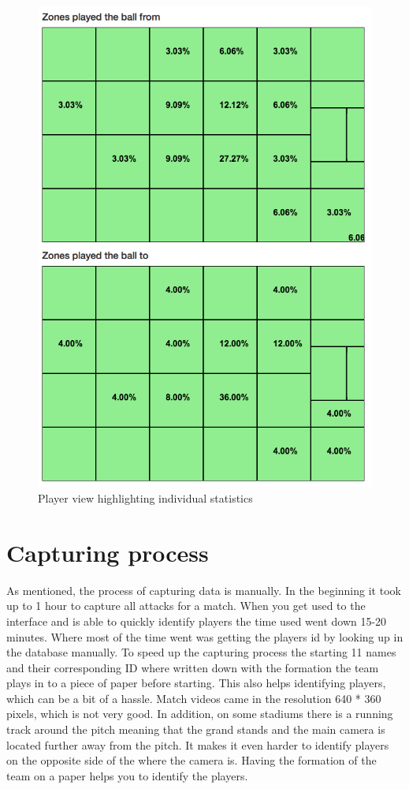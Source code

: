 \begin{figure}[ht!]
\centering
\includegraphics[width=1\textwidth]{images/general/player_view2.png}
\caption{Player view highlighting individual statistics}
\label{fig:player_view2}
\end{figure}


\section{Capturing process}
\label{sec:capprocess}

As mentioned, the process of capturing data is manually. In the beginning it took up to 1 hour to capture all attacks for a match. When you get used to the interface and is able to quickly identify players the time used went down 15-20 minutes. Where most of the time went was getting the players id by looking up in the database manually. To speed up the capturing process the starting 11 names and their corresponding ID where written down with the formation the team plays in to a piece of paper before starting. This also helps identifying players, which can be a bit of a hassle. Match videos came in the resolution 640 * 360 pixels, which is not very good. In addition, on some stadiums there is a running track around the pitch meaning that the grand stands and the main camera is located further away from the pitch. It makes it even harder to identify players on the opposite side of the where the camera is. Having the formation of the team on a paper helps you to identify the players.

